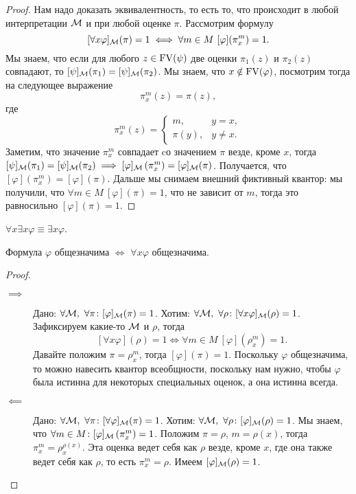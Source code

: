 \begin{proof}
    Нам надо доказать эквивалентность, то есть то, что происходит в любой интерпретации $\mathcal{M}$ и при любой оценке $\pi$.
    Рассмотрим формулу
    $$
        [\forall x \varphi]_{\mathcal{M}}(\pi) = 1 \iff \forall m \in M~ [\varphi](\pi_{x}^{m}) = 1.
    $$
    Мы знаем, что если для любого $z \in \mathrm{FV}(\psi)$ две оценки $\pi_{1}(z)$ и $\pi_{2}(z)$ совпадают, то $[\psi]_{\mathcal{M}}(\pi_{1}) = [\psi]_{\mathcal{M}}(\pi_{2})$. %
    Мы знаем, что $x \notin \mathrm{FV}(\varphi)$, посмотрим тогда на следующее выражение
    $$
        \pi_{x}^{m}(z) = \pi(z),
    $$
    где
    $$
        \pi_{x}^{m}(z) = \begin{cases}
            m, & y = x,  \\
            \pi(y), & y \neq x.
        \end{cases}
    $$
    Заметим, что значение $\pi_{x}^{m}$ совпадает cо значением $\pi$ везде, кроме $x$, тогда $[\psi]_{\mathcal{M}}(\pi_{1}) = [\psi]_{\mathcal{M}}(\pi_{2}) \implies [\varphi]_{\mathcal{M}}\left(\pi_{x}^{m}\right) = [\varphi]_{\mathcal{M}}(\pi)$.
    Получается, что $[\varphi]\left(\pi_{x}^{m}\right) = [\varphi](\pi)$.
    Дальше мы снимаем внешний фиктивный квантор: мы получили, что $\forall m \in M~[\varphi](\pi) = 1$, что не зависит от $m$, тогда это равносильно $[\varphi](\pi) = 1$.
\end{proof}

\begin{corollary}
    $\forall x \exists x \varphi \equiv \exists x \varphi$.
\end{corollary}

\begin{statement}
    Формула $\varphi$ общезначима $\iff$ $\forall x \varphi$ общезначима.
\end{statement}

\begin{proof}~
    \begin{description}
        \item[$\implies$] Дано: $\forall \mathcal{M},~\forall \pi \colon [\varphi]_{\mathcal{M}}(\pi) = 1$.
        Хотим: $\forall \mathcal{M},~\forall \rho \colon [\forall x \varphi]_{\mathcal{M}}(\rho) = 1$.
        Зафиксируем какие-то $\mathcal{M}$ и $\rho$, тогда
        $$
            [\forall x \varphi](\rho) = 1 \iff \forall m \in M~ [\varphi]\left(\rho_{x}^{m}\right) = 1.
        $$
        Давайте положим $\pi = \rho_{x}^{m}$, тогда $[\varphi](\pi) = 1$.
        Поскольку $\varphi$ общезначима, то можно навесить квантор всеобщности, поскольку нам нужно, чтобы $\varphi$ была истинна для некоторых специальных оценок, а она истинна всегда.
        \item[$\impliedby$] Дано: $\forall \mathcal{M},~\forall \pi \colon [\forall\varphi]_{\mathcal{M}}(\pi) = 1$.
        Хотим: $\forall \mathcal{M},~\forall \rho \colon [\varphi]_{\mathcal{M}}(\rho) = 1$.
        Мы знаем, что $\forall m \in M \colon [\varphi]_{\mathcal{M}}\left(\pi_{x}^{m}\right) = 1$.
        Положим $\pi = \rho$, $m = \rho(x)$, тогда $\pi_{x}^{m} = \rho_{x}^{\rho(x)}$.
        Эта оценка ведет себя как $\rho$ везде, кроме $x$, где она также ведет себя как $\rho$, то есть $\pi_{x}^{m} = \rho$.
        Имеем $[\varphi]_{\mathcal{M}}(\rho) = 1$. \qedhere
    \end{description}
\end{proof}

